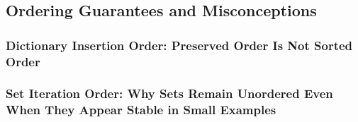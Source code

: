 \subsection{Ordering Guarantees and Misconceptions}
\subsubsection{Dictionary Insertion Order: Preserved Order Is Not Sorted Order}
\subsubsection{Set Iteration Order: Why Sets Remain Unordered Even When They Appear Stable in Small Examples}
